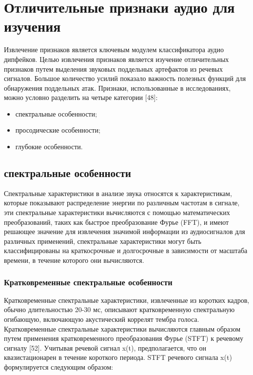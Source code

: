 \chapter{Отличительные признаки аудио для изучения}

Извлечение признаков является ключевым модулем классификатора аудио дипфейков. Целью извлечения признаков является изучение отличительных признаков путем выделения звуковых поддельных артефактов из речевых сигналов. Большое количество усилий показало важность полезных функций для обнаружения поддельных атак. Признаки, использованные в исследованиях, можно условно разделить на четыре категории [48]: 
\begin{itemize}
    \item спектральные особенности;
    \item просодические особенности;
    \item глубокие особенности.
\end{itemize}

\section{спектральные особенности}

Спектральные характеристики в анализе звука относятся к характеристикам, которые показывают распределение энергии по различным частотам в сигнале, эти спектральные характеристики вычисляются с помощью математических преобразований, таких как быстрое преобразование Фурье (FFT), и имеют решающее значение для извлечения значимой информации из аудиосигналов для различных применений, спектральные характеристики могут быть классифицированы на краткосрочные и долгосрочные в зависимости от масштаба времени, в течение которого они вычисляются.

\subsection{Кратковременные спектральные особенности}

Кратковременные спектральные характеристики, извлеченные из коротких кадров, обычно длительностью 20-30 мс, описывают кратковременную спектральную огибающую, включающую акустический коррелят тембра голоса. Кратковременные спектральные характеристики вычисляются главным образом путем применения кратковременного преобразования Фурье (STFT) к речевому сигналу [52]. Учитывая речевой сигнал x(t), предполагается, что он квазистационарен в течение короткого периода. STFT речевого сигнала x(t) формулируется следующим образом:

